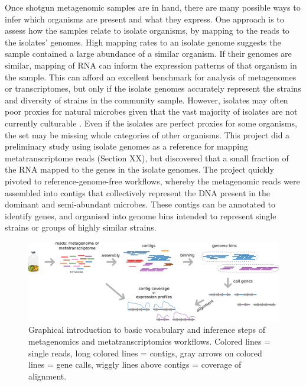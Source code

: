 Once shotgun metagenomic samples are in hand, there are many possible ways to infer which organisms are present and what they express.
One approach is to assess how the samples relate to isolate organisms, by mapping to the reads to the isolates' genomes.
High mapping rates to an isolate genome suggests the sample contained a large abundance of a similar organism.
If their genomes are similar, mapping of RNA can inform the expression patterns of that organism in the sample.
This can afford an excellent benchmark for analysis of metagenomes or transcriptomes, but only if the isolate genomes accurately represent the strains and diversity of strains in the community sample.
However, isolates may often poor proxies for natural microbes given that the vast majority of isolates are not currently culturable \cite{kaeberlein2002, stewart2012}.
Even if the isolates are perfect proxies for some organisms, the set may be missing whole categories of other organisms.
This project did a preliminary study using isolate genomes as a reference for mapping metatranscriptome reads (Section XX), but discovered that a small fraction of the RNA mapped to the genes in the isolate genomes.
The project quickly pivoted to reference-genome-free workflows, whereby the metagenomic reads were assembled into contigs that collectively represent the DNA present in the dominant and semi-abundant microbes.
These contigs can be annotated to identify genes, and organised into genome bins intended to represent single strains or groups of highly similar strains.

\begin{figure}[H]
\centering
     \includegraphics[width=1.0\textwidth]{./tex/chapter2/figures/170312_metagenomics_metatranscriptomics_overview.pdf}
     \begin{singlespace}
     \caption[Overview of metagenomics/metatranscriptomics workflow.]{
        Graphical introduction to basic vocabulary and inference steps of metagenomics and metatranscriptomics workflows.
		Colored lines = single reads, long colored lines = contigs,
		gray arrows on colored lines = gene calls, wiggly lines above contigs = coverage of alignment.}
     \label{fig:meta_workflow}
     \end{singlespace}
\end{figure}

